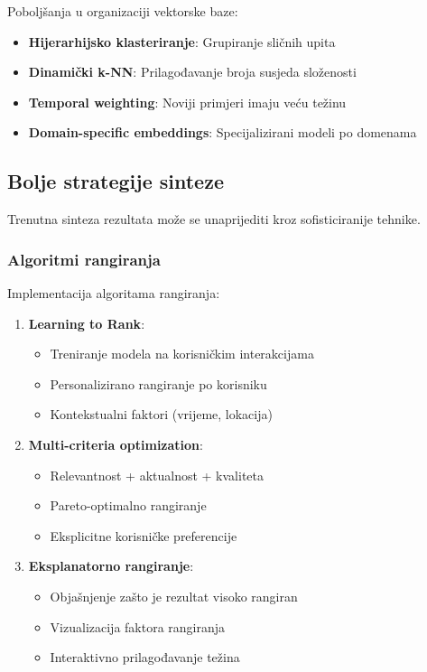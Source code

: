 Poboljšanja u organizaciji vektorske baze:

\begin{itemize}
    \item \textbf{Hijerarhijsko klasteriranje}: Grupiranje sličnih upita
    \item \textbf{Dinamički k-NN}: Prilagođavanje broja susjeda složenosti
    \item \textbf{Temporal weighting}: Noviji primjeri imaju veću težinu
    \item \textbf{Domain-specific embeddings}: Specijalizirani modeli po domenama
\end{itemize}

\subsection{Bolje strategije sinteze}

Trenutna sinteza rezultata može se unaprijediti kroz sofisticiranije tehnike.

\subsubsection{Algoritmi rangiranja}

Implementacija algoritama rangiranja:

\begin{enumerate}
    \item \textbf{Learning to Rank}:
    \begin{itemize}
        \item Treniranje modela na korisničkim interakcijama
        \item Personalizirano rangiranje po korisniku
        \item Kontekstualni faktori (vrijeme, lokacija)
    \end{itemize}
    
    \item \textbf{Multi-criteria optimization}:
    \begin{itemize}
        \item Relevantnost + aktualnost + kvaliteta
        \item Pareto-optimalno rangiranje
        \item Eksplicitne korisničke preferencije
    \end{itemize}
    
    \item \textbf{Eksplanatorno rangiranje}:
    \begin{itemize}
        \item Objašnjenje zašto je rezultat visoko rangiran
        \item Vizualizacija faktora rangiranja
        \item Interaktivno prilagođavanje težina
    \end{itemize}
\end{enumerate}


